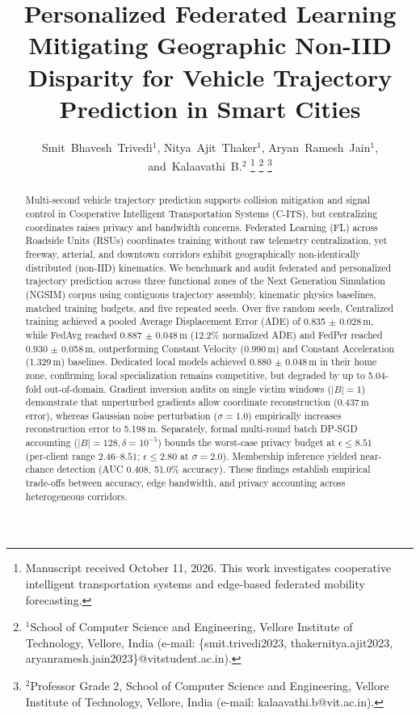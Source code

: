 \documentclass[journal]{IEEEtran}
\begin{document}
\title{Personalized Federated Learning Mitigating Geographic Non-IID Disparity for Vehicle Trajectory Prediction in Smart Cities}

\author{Smit~Bhavesh~Trivedi$^{1}$, Nitya~Ajit~Thaker$^{1}$, Aryan~Ramesh~Jain$^{1}$, and~Kalaavathi~B.$^{2}$%
\thanks{Manuscript received October 11, 2026. This work investigates cooperative intelligent transportation systems and edge-based federated mobility forecasting.}%
\thanks{$^{1}$School of Computer Science and Engineering, Vellore Institute of Technology, Vellore, India (e-mail: \{smit.trivedi2023, thakernitya.ajit2023, aryanramesh.jain2023\}@vitstudent.ac.in).}%
\thanks{$^{2}$Professor Grade 2, School of Computer Science and Engineering, Vellore Institute of Technology, Vellore, India (e-mail: kalaavathi.b@vit.ac.in).}%
}

\markboth{}{}

\maketitle

\begin{abstract}
Multi-second vehicle trajectory prediction supports collision mitigation and signal control in Cooperative Intelligent Transportation Systems (C-ITS), but centralizing coordinates raises privacy and bandwidth concerns. Federated Learning (FL) across Roadside Units (RSUs) coordinates training without raw telemetry centralization, yet freeway, arterial, and downtown corridors exhibit geographically non-identically distributed (non-IID) kinematics. We benchmark and audit federated and personalized trajectory prediction across three functional zones of the Next Generation Simulation (NGSIM) corpus using contiguous trajectory assembly, kinematic physics baselines, matched training budgets, and five repeated seeds. Over five random seeds, Centralized training achieved a pooled Average Displacement Error (ADE) of 0.835 $\pm$ 0.028\,m, while FedAvg reached 0.887 $\pm$ 0.048\,m (12.2\% normalized ADE) and FedPer reached 0.930 $\pm$ 0.058\,m, outperforming Constant Velocity (0.990\,m) and Constant Acceleration (1.329\,m) baselines. Dedicated local models achieved 0.880 $\pm$ 0.048\,m in their home zone, confirming local specialization remains competitive, but degraded by up to 5.04-fold out-of-domain. Gradient inversion audits on single victim windows ($|B|=1$) demonstrate that unperturbed gradients allow coordinate reconstruction (0.437\,m error), whereas Gaussian noise perturbation ($\sigma=1.0$) empirically increases reconstruction error to 5.198\,m. Separately, formal multi-round batch DP-SGD accounting ($|B|=128, \delta=10^{-5}$) bounds the worst-case privacy budget at $\epsilon \le 8.51$ (per-client range $2.46$--$8.51$; $\epsilon \le 2.80$ at $\sigma=2.0$). Membership inference yielded near-chance detection (AUC 0.408, 51.0\% accuracy). These findings establish empirical trade-offs between accuracy, edge bandwidth, and privacy accounting across heterogeneous corridors.
\end{abstract}
\end{document}
